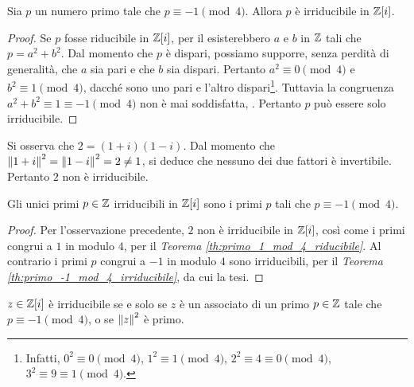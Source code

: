 \documentclass[11pt]{scrbook}
\begin{document}
\begin{theorem}
    \label{th:primo_-1_mod_4_irriducibile}
    Sia $p$ un numero primo tale che $p \equiv -1 \pmod4$. Allora
    $p$ è irriducibile in $\mathbb{Z}[i]$.
\end{theorem}

\begin{proof}
    Se $p$ fosse riducibile in
    $\mathbb{Z}[i]$, per il  esisterebbero $a$ e $b$
    in $\mathbb Z$ tali che $p=a^2+b^2$. Dal momento che $p$ è dispari,
    possiamo supporre, senza perdità di generalità, che
    $a$ sia pari e che $b$ sia dispari. Pertanto $a^2 \equiv 0 \pmod 4$ e $b^2 \equiv 1 \pmod 4$, dacché sono uno pari e l'altro dispari\footnote{Infatti, $0^2 \equiv 0
            \pmod4$, $1^2 \equiv 1 \pmod4$, $2^2 \equiv 4 \equiv 0 \pmod 4$,
        $3^2 \equiv 9 \equiv 1 \pmod 4$.}. Tuttavia la congruenza
    $a^2+b^2 \equiv 1 \equiv -1 \pmod4$ non è mai soddisfatta,
    \Lightning{}. Pertanto $p$ può essere solo irriducibile.
\end{proof}

\begin{remark*}
    Si osserva che $2=(1+i)(1-i)$. Dal momento che $\left\lVert 1+i \right\rVert^2=
        \left\lVert 1-i \right\rVert^2=2\neq1$, si deduce che nessuno dei due fattori
    è invertibile. Pertanto $2$ non è irriducibile.
\end{remark*}

\begin{proposition}
    \label{prop:irriducibili_zz_zzi}
    Gli unici primi $p \in \mathbb Z$ irriducibili in $\mathbb{Z}[i]$ sono i primi $p$ tali
    che $p \equiv -1 \pmod4$.
\end{proposition}

\begin{proof}
    Per l'osservazione precedente, $2$ non è irriducibile in $\mathbb{Z}[i]$,
    così come i primi congrui a $1$ in modulo $4$,
    per il \textit{Teorema \ref{th:primo_1_mod_4_riducibile}}. Al
    contrario i primi $p$ congrui a $-1$ in modulo $4$ sono
    irriducibili, per il \textit{Teorema \ref{th:primo_-1_mod_4_irriducibile}}, da cui la tesi.
\end{proof}

\begin{theorem}
    $z \in \mathbb{Z}[i]$ è irriducibile se e solo se $z$ è un associato di un primo $p \in \mathbb Z$ tale che $p \equiv -1 \pmod 4$, o se $\left\lVert z \right\rVert^2$ è primo.
\end{theorem}
\end{document}
